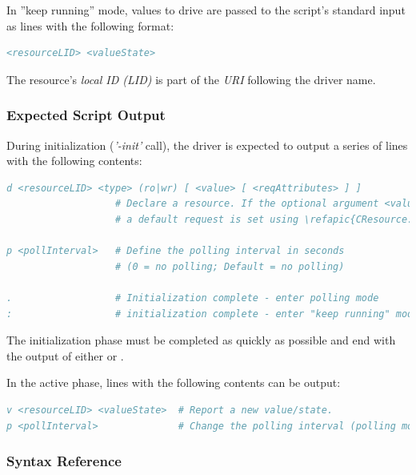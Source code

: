 \documentclass[12pt,english,parskip=half,headheight=19pt]{scrreprt}
\newcommand{\lst}[1]{\colorbox{lstbackground}{\footnotesize\code{#1}}}
\newcommand{\refapic}[1]{\href{home2l-api_c/index.html}{\mbox{\texttt{#1}}}}            %
\begin{document}
In ''keep running'' mode, values to drive are passed to the script's standard input as lines with the following format:
\begin{lstlisting}[language=comments]
<resourceLID> <valueState>
\end{lstlisting}

The resource's \textit{local ID (LID)} is part of the \textit{URI} following the driver name.


\subsubsection*{Expected Script Output}

During initialization (\textit{'-init'} call), the driver is expected
to output a series of lines with the following contents:
\begin{lstlisting}[language=comments]
d <resourceLID> <type> (ro|wr) [ <value> [ <reqAttributes> ] ]
                   # Declare a resource. If the optional argument <value> is supplied,
                   # a default request is set using \refapic{CResource::SetDefault()}.

p <pollInterval>   # Define the polling interval in seconds
                   # (0 = no polling; Default = no polling)

.                  # Initialization complete - enter polling mode
:                  # initialization complete - enter "keep running" mode
\end{lstlisting}

The initialization phase must be completed as quickly as possible and end with the output of either \lst{.} or \lst{:}.

In the active phase, lines with the following contents can be output:
\begin{lstlisting}[language=comments]
v <resourceLID> <valueState>  # Report a new value/state.
p <pollInterval>              # Change the polling interval (polling mode only).
\end{lstlisting}


\subsubsection*{Syntax Reference}
\end{document}
